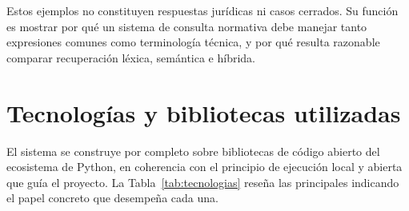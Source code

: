 Estos ejemplos no constituyen respuestas jurídicas ni casos cerrados. Su función es mostrar por qué un sistema de consulta normativa debe manejar tanto expresiones comunes como terminología técnica, y por qué resulta razonable comparar recuperación léxica, semántica e híbrida.

\section{Tecnologías y bibliotecas utilizadas}
\label{sec:tecnologias}

El sistema se construye por completo sobre bibliotecas de código abierto del ecosistema de Python, en coherencia con el principio de ejecución local y abierta que guía el proyecto. La Tabla~\ref{tab:tecnologias} reseña las principales indicando el papel concreto que desempeña cada una.

